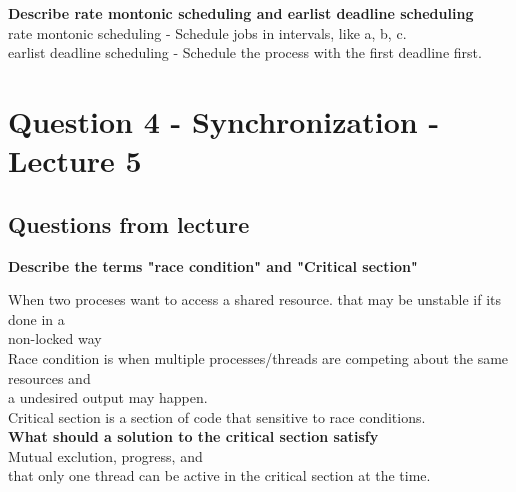 \documentclass[a4paper,10pt,titlepage]{report}
\begin{document}
\textbf{Describe rate montonic scheduling and earlist deadline scheduling\\}
\hspace{10mm} rate montonic scheduling - Schedule jobs in intervals, like a, b, c.\\
\hspace{10mm} earlist deadline scheduling - Schedule the process with the first deadline first.\\

\newpage
\section{Question 4 - Synchronization - Lecture 5}

\subsection{Questions from lecture}

\textbf{Describe the terms "race condition" and "Critical section"\\}

\hspace{10mm} When two proceses want to access a shared resource. that may be unstable if its done in a \\ \hspace{10mm} non-locked way\\
\hspace{10mm} 
Race condition is when multiple processes/threads are competing about the same resources and \\ \hspace{10mm}  a undesired output may happen. \\ \vspace{5mm}
\hspace{10mm}  Critical section is a section of code that sensitive to race conditions.\\



\textbf{What should a solution to the critical section satisfy \\}
\hspace{10mm}  Mutual exclution, progress, and \\
\hspace{10mm}  that only one thread can be active in the critical section at the time. \\\vspace{5mm}
\end{document}
